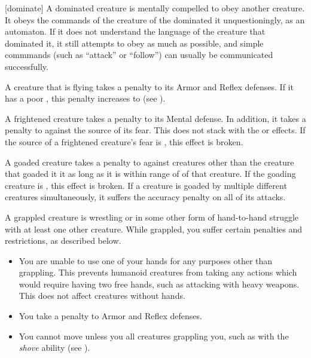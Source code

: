     [dominate] A dominated creature is mentally compelled to obey another creature.
    It obeys the commands of the creature of the dominated it unquestioningly, as an automaton.
    If it does not understand the language of the creature that dominated it, it still attempts to obey as much as possible, and simple commmands (such as ``attack'' or ``follow'') can usually be communicated successfully.

     A creature that is flying takes a  penalty to its Armor and Reflex defenses.
    If it has a poor , this penalty increases to  (see ).

     A frightened creature takes a  penalty to its Mental defense.
    In addition, it takes a  penalty to  against the source of its fear.
    This does not stack with the \shaken or \panicked effects.
    If the source of a frightened creature's fear is , this effect is broken.

     A goaded creature takes a  penalty to  against creatures other than the creature that goaded it it as long as it is within \rngmed range of of that creature.
    If the goading creature is , this effect is broken.
    If a creature is goaded by multiple different creatures simultaneously, it suffers the accuracy penalty on all of its attacks.

     A grappled creature is wrestling or in some other form of hand-to-hand struggle with at least one other creature.
    While grappled, you suffer certain penalties and restrictions, as described below.
    \begin{itemize}
        \item You are unable to use one of your hands for any purposes other than grappling.
            This prevents humanoid creatures from taking any actions which would require having two free hands, such as attacking with heavy weapons.
            This does not affect creatures without hands.
        \item You take a  penalty to Armor and Reflex defenses.
        \item You cannot move unless you  all creatures grappling you, such as with the \textit{shove} ability (see ).
    \end{itemize}

